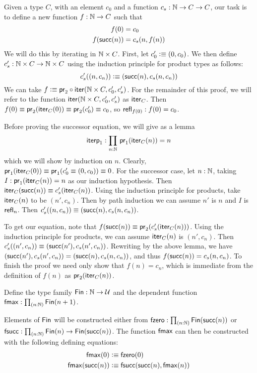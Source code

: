 \begin{solution}
  Given a type $C$, with an element $c_0$ and a function $c_s : \mathbb{N} \to C \to C$, our task is to define a new function $f : \mathbb{N} \to C$ such that
  \begin{align*}
    f(0) &= c_0 \\
    f(\mathsf{succ}(n)) &= c_s(n,f(n))
  \end{align*}
  We will do this by iterating in $\mathbb{N} \times C$.
  First, let $c_0' \vcentcolon\equiv (0,c_0)$.
  We then define $c_s' : \mathbb{N} \times C \to \mathbb{N} \times C$ using the induction principle for product types as follows:
  $$ c_s'((n,c_n)) \vcentcolon\equiv (\mathsf{succ}(n) , c_s(n,c_n)) $$
  We can take $f \vcentcolon\equiv \mathsf{pr}_{2} \circ \mathsf{iter}(\mathbb{N} \times C, c_0', c_s')$.
  For the remainder of this proof, we will refer to the function $\mathsf{iter}(\mathbb{N} \times C,c_0',c_s')$ as $\mathsf{iter}_C$.
  Then $f(0) \equiv \mathsf{pr}_{2}(\mathsf{iter}_C(0)) \equiv \mathsf{pr}_{2}(c_0') \equiv c_0$, so $\mathsf{refl}_{f(0)} : f(0) = c_0$.

  Before proving the successor equation, we will give as a lemma
  $$ \mathsf{iterp}_1 : \prd{n : \nat} \fst(\ite_C(n)) = n $$
  which we will show by induction on $n$.
  Clearly, $\mathsf{pr}_{1}(\mathsf{iter}_C(0)) \equiv \mathsf{pr}_{1}(c_0' \equiv (0,c_0)) \equiv 0$.
  For the successor case, let $n : \mathbb{N}$, taking $I : \mathsf{pr}_{1}(\mathsf{iter}_C(n)) = n$ as our induction hypothesis.
  Then $\mathsf{iter}_C(\mathsf{succ}(n)) \equiv c_s'(\mathsf{iter}_C(n))$.
  Using the induction principle for products, take $\mathsf{iter}_C(n)$ to be $(n',c_n)$.
  Then by path induction we can assume $n'$ is $n$ and $I$ is $\mathsf{refl}_{n}$.
  Then $c_s'((n,c_n)) \equiv (\mathsf{succ}(n),c_s(n,c_n))$.

  To get our equation, note that $f(\mathsf{succ}(n)) \equiv \mathsf{pr}_{2}(c_s'(\mathsf{iter}_C(n)))$.
  Using the induction principle for products, we can assume $\mathsf{iter}_C(n)$ is $(n',c_n)$.
  Then $c_s'((n',c_n)) \equiv (\mathsf{succ}(n'),c_s(n',c_n))$.
  Rewriting by the above lemma, we have $(\mathsf{succ}(n'),c_s(n',c_n)) = (\mathsf{succ}(n),c_s(n,c_n))$, and thus $f(\mathsf{succ}(n)) = c_s(n,c_n)$.
  To finish the proof we need only show that $f(n) = c_n$, which is immediate from the definition of $f(n)$ as $\mathsf{pr}_{2}(\mathsf{iter}_C(n))$.
\end{solution}

\begin{problem}
  Define the type family $\mathsf{Fin} : \mathbb{N} \to \mathcal{U}$ and the dependent function $\fmax : \prd{n:\nat} \Fin(n + 1)$.
\end{problem}

\begin{solution}
  Elements of $\mathsf{Fin}$ will be constructed either from $\mathsf{fzero} : \prd{n : \nat}\Fin(\suc(n))$ or $\mathsf{fsucc} : \prd{n : \nat} \Fin(n) \to \Fin(\suc(n))$.
  The function $\mathsf{fmax}$ can then be constructed with the following defining equations:
  \begin{align*}
    \mathsf{fmax}(0) &\vcentcolon\equiv \mathsf{fzero}(0) \\
    \mathsf{fmax}(\mathsf{succ}(n)) &\vcentcolon\equiv \mathsf{fsucc}(\mathsf{succ}(n),\mathsf{fmax}(n))
  \end{align*}
\end{solution}

